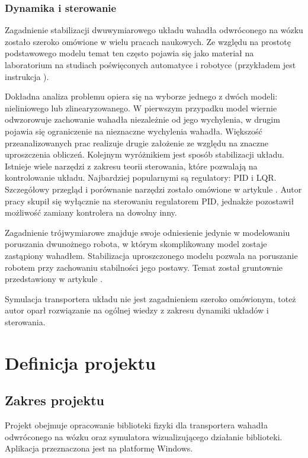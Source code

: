 \documentclass[12pt, oneside]{report}
\theoremstyle{definition}
\begin{document}
\subsection{Dynamika i sterowanie}
Zagadnienie stabilizacji dwuwymiarowego układu wahadła odwróconego na wózku zostało szeroko omówione w wielu pracach naukowych. Ze względu na prostotę podstawowego modelu temat ten często pojawia się jako materiał na laboratorium na studiach poświęconych automatyce i robotyce (przykładem jest instrukcja \cite{LMIP}).

Dokładna analiza problemu opiera się na wyborze jednego z dwóch modeli: nieliniowego lub zlinearyzowanego. W pierwszym przypadku model wiernie odwzorowuje zachowanie wahadła niezależnie od jego wychylenia, w drugim pojawia się ograniczenie na nieznaczne wychylenia wahadła. Większość przeanalizowanych prac realizuje drugie założenie ze względu na znaczne uproszczenia obliczeń. Kolejnym wyróżnikiem jest sposób stabilizacji układu. Istnieje wiele narzędzi z zakresu teorii sterowania, które pozwalają na kontrolowanie układu. Najbardziej popularnymi są regulatory: PID i LQR. Szczegółowy przegląd i porównanie narzędzi zostało omówione w artykule \cite{OptimalControl}. Autor pracy skupił się wyłącznie na sterowaniu regulatorem PID, jednakże pozostawił możliwość zamiany kontrolera na dowolny inny.

Zagadnienie trójwymiarowe znajduje swoje odniesienie jedynie w modelowaniu poruszania dwunożnego robota, w którym skomplikowany model zostaje zastąpiony wahadłem. Stabilizacja uproszczonego modelu pozwala na poruszanie robotem przy zachowaniu stabilności jego postawy. Temat został gruntownie przedstawiony w artykule \cite{BipedWalking}.

Symulacja transportera układu nie jest zagadnieniem szeroko omówionym, toteż autor oparł rozwiązanie na ogólnej wiedzy z zakresu dynamiki układów i sterowania. 


\newpage
\chapter{Definicja projektu}
\section{Zakres projektu}
Projekt obejmuje opracowanie biblioteki fizyki dla transportera wahadła odwróconego na wózku oraz symulatora wizualizującego działanie biblioteki. Aplikacja przeznaczona jest na platformę Windows.
\end{document}
